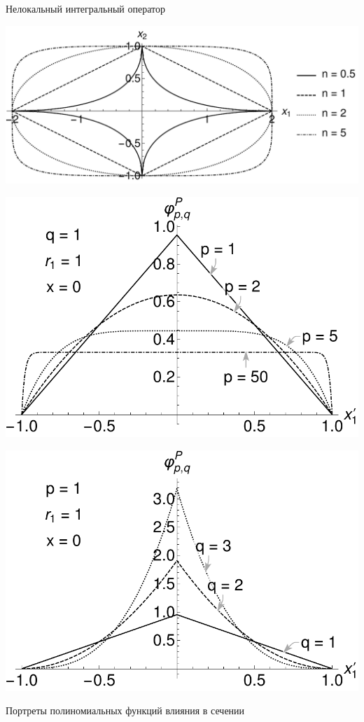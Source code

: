 \begin{frame}{Нелокальный интегральный оператор}
	\begin{minipage}[b][][b]{0.32\linewidth}\centering
		\includegraphics[width=\textwidth]{pics/SuperEllipse.pdf}
	\end{minipage}
    \hfill
    \begin{minipage}[b][][b]{0.32\linewidth}\centering
        \includegraphics[width=\linewidth]{pics/PolynomialInfluenceP.pdf}
    \end{minipage}
    \hfill
    \begin{minipage}[b][][b]{0.32\linewidth}\centering
        \includegraphics[width=\linewidth]{pics/PolynomialInfluenceQ.pdf}
    \end{minipage}
    \begin{center}
	    Портреты полиномиальных функций влияния в сечении
    	\end{center}
\end{frame}

